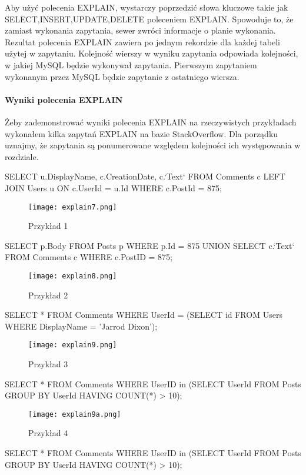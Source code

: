 Aby użyć polecenia EXPLAIN, wystarczy poprzedzić słowa kluczowe takie jak SELECT,INSERT,UPDATE,DELETE poleceniem EXPLAIN. Spowoduje to, że zamiast wykonania zapytania, sewer zwróci informacje o planie wykonania. Rezultat polecenia EXPLAIN zawiera po jednym rekordzie dla każdej tabeli użytej w zapytaniu. Kolejność wierszy w wyniku zapytania odpowiada kolejności, w jakiej MySQL będzie wykonywał zapytania.  Pierwszym zapytaniem wykonanym przez MySQL będzie zapytanie z ostatniego wiersza.

\paragraph{Wyniki polecenia EXPLAIN}
Żeby zademonstrować wyniki polecenia EXPLAIN na rzeczywistych przykładach wykonałem kilka zapytań EXPLAIN na bazie StackOverflow. Dla porządku uznajmy, że zapytania są ponumerowane względem kolejności ich występowania w rozdziale.
\begin{spverbatim}
	SELECT u.DisplayName, c.CreationDate, c.`Text` FROM  Comments c LEFT JOIN Users u ON c.UserId = u.Id WHERE c.PostId = 875;
\end{spverbatim}
\begin{figure}[H]
	\texttt{[image: explain7.png]} 
	\caption{Przykład 1}
\end{figure}
\begin{spverbatim}
	SELECT p.Body FROM Posts p WHERE p.Id = 875 UNION
	SELECT c.`Text` FROM Comments c WHERE c.PostID = 875;
\end{spverbatim}
\begin{figure}[H]
	\texttt{[image: explain8.png]} 
	\caption{Przykład 2}
\end{figure}
\begin{spverbatim}
	SELECT * FROM Comments WHERE UserId = (SELECT id FROM Users WHERE DisplayName = 'Jarrod Dixon');
\end{spverbatim}
\begin{figure}[H]
	\texttt{[image: explain9.png]} 
	\caption{Przykład 3}
\end{figure}
\begin{spverbatim}
	SELECT * FROM Comments WHERE UserID in (SELECT UserId FROM Posts GROUP BY UserId HAVING COUNT(*) > 10);
\end{spverbatim}
\begin{figure}[H]
	\texttt{[image: explain9a.png]} 
	\caption{Przykład 4}
\end{figure}
\begin{spverbatim}
	SELECT * FROM Comments WHERE UserID in (SELECT UserId FROM Posts GROUP BY UserId HAVING COUNT(*) > 10);
\end{spverbatim}

